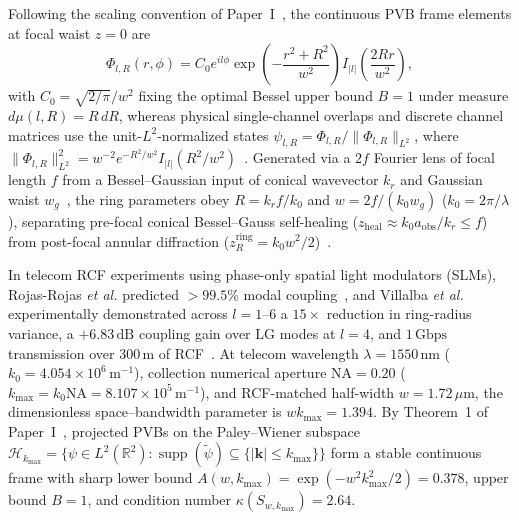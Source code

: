 \documentclass[aps,pra,onecolumn,notitlepage,11pt,tightenlines,nofootinbib,floatfix,longbibliography]{revtex4-2}
\newcommand{\norm}[1]{\lVert #1 \rVert}
\newcommand{\abs}[1]{\lvert #1 \rvert}
\begin{document}
Following the scaling convention of Paper~I~\cite{AyalaPaperI}, the continuous PVB frame elements at focal waist $z = 0$ are
\begin{equation}
\Phi_{l,R}(r,\phi) = C_0 e^{il\phi} \exp\!\left(-\frac{r^2 + R^2}{w^2}\right) I_{\abs{l}}\!\left(\frac{2Rr}{w^2}\right),
\label{eq:pvb_frame_def}
\end{equation}
with $C_0 = \sqrt{2/\pi}/w^2$ fixing the optimal Bessel upper bound $B = 1$ under measure $d\mu(l,R) = R\,dR$, whereas physical single-channel overlaps and discrete channel matrices use the unit-$L^2$-normalized states $\psi_{l,R} = \Phi_{l,R}/\norm{\Phi_{l,R}}_{L^2}$, where $\norm{\Phi_{l,R}}_{L^2}^2 = w^{-2} e^{-R^2/w^2} I_{\abs{l}}(R^2/w^2)$~\cite{Gradshteyn2014}. Generated via a $2f$ Fourier lens of focal length $f$ from a Bessel--Gaussian input of conical wavevector $k_r$ and Gaussian waist $w_g$~\cite{Vaity2015,Gori1987}, the ring parameters obey $R = k_r f/k_0$ and $w = 2f/(k_0 w_g)$ ($k_0 = 2\pi/\lambda$), separating pre-focal conical Bessel--Gauss self-healing ($z_{\mathrm{heal}} \approx k_0 a_{\mathrm{obs}}/k_r \le f$) from post-focal annular diffraction ($z_R^{\mathrm{ring}} = k_0 w^2/2$)~\cite{Reddy2016,AyalaPaperI}.

In telecom RCF experiments using phase-only spatial light modulators (SLMs), Rojas-Rojas \emph{et al.} predicted $>99.5\%$ modal coupling~\cite{RojasRojas2021}, and Villalba \emph{et al.} experimentally demonstrated across $l = 1\text{--}6$ a $15\times$ reduction in ring-radius variance, a $+6.83\,\mathrm{dB}$ coupling gain over $\mathrm{LG}$ modes at $l = 4$, and $1\,\mathrm{Gbps}$ transmission over $300\,\mathrm{m}$ of RCF~\cite{Villalba2023}. At telecom wavelength $\lambda = 1550\,\mathrm{nm}$ ($k_0 = 4.054\times 10^6\,\mathrm{m}^{-1}$), collection numerical aperture $\mathrm{NA} = 0.20$ ($k_{\max} = k_0\mathrm{NA} = 8.107\times 10^5\,\mathrm{m}^{-1}$), and RCF-matched half-width $w = 1.72\,\mu\mathrm{m}$, the dimensionless space--bandwidth parameter is $w k_{\max} = 1.394$. By Theorem~1 of Paper~I~\cite{AyalaPaperI}, projected PVBs on the Paley--Wiener subspace $\mathcal{H}_{k_{\max}} = \{\psi \in L^2(\mathbb{R}^2) : \operatorname{supp}(\widetilde{\psi}) \subseteq \{\abs{\mathbf{k}} \le k_{\max}\}\}$ form a stable continuous frame with sharp lower bound $A(w,k_{\max}) = \exp(-w^2 k_{\max}^2/2) = 0.378$, upper bound $B = 1$, and condition number $\kappa(S_{w,k_{\max}}) = 2.64$.
\end{document}
